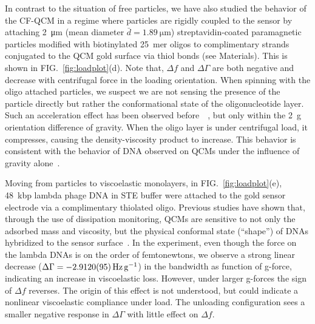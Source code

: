 \documentclass[floatfix,superscriptaddress,a4paper,twocolumn]{revtex4-1}
\newcommand{\Figure}[1]{FIG.~\ref{#1}}
\newcommand{\df}{\Delta\!f}
\newcommand{\dg}{\Delta\Gamma}
\begin{document}
In contrast to the situation of free particles, we have also studied the
behavior of the CF-QCM in a regime where particles are rigidly coupled to
the sensor by attaching \SI{2}{\micro\meter} (mean diameter
$\bar{d}=\SI{1.89}{\micro\meter}$) streptavidin-coated paramagnetic
particles modified with biotinylated \SI{25}{mer} oligos to complimentary
strands conjugated to the QCM gold surface via thiol bonds (see
Materials).  This is shown in \Figure{fig:loadplot}(d).  Note
that, $\df$ and $\dg$ are both negative and decrease
with centrifugal force in the loading orientation.
When spinning with the oligo attached
particles, we suspect we are not sensing the presence of the particle
directly but rather the conformational state of the oligonucleotide layer.
Such an acceleration effect has been observed
before~\cite{yoshimoto2002effect}~\cite{fawcett2004evidence}, but only
within the \SI{2}{g} orientation difference of gravity.  When the oligo
layer is under centrifugal load, it compresses, causing the
density-viscosity product to increase.  This behavior is consistent with
the behavior of DNA observed on QCMs under the influence of gravity
alone~\cite{fawcett2004evidence}.

Moving from particles to viscoelastic monolayers, in
\Figure{fig:loadplot}(e), \SI{48}{kbp} lambda phage DNA in STE buffer were
attached to the gold sensor electrode via a complimentary thiolated oligo.  Previous studies have shown that,
through the use of dissipation monitoring, QCMs are sensitive to not only
the adsorbed mass and viscosity, but the physical conformal state
(``shape'') of DNAs hybridized to the sensor
surface~\cite{tsortos2008shear}.  In the experiment, even though the force
on the lambda DNAs is on the order of femtonewtons, we observe a strong
linear decrease ($\dg=\SI{-2.912+-0.0095}{\hertz\per\g}$) in the
bandwidth as function of g-force, indicating an
increase in viscoelastic loss.  However, under larger g-forces the sign of
$\df$ reverses.  The origin of this effect is not understood, but
could indicate a nonlinear viscoelastic compliance under load.  The
unloading configuration sees a smaller negative response in $\dg$ with little
effect on $\df$.
\end{document}
